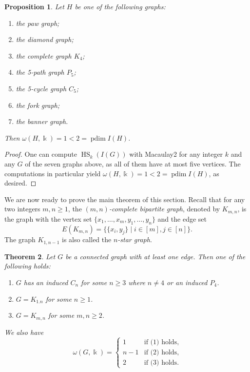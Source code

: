 \documentclass[reqno]{amsart}
\DeclareMathOperator{\pdim}{pdim}
\DeclareMathOperator{\HS}{HS}
\newtheorem{theorem}{Theorem}[section]
\newtheorem{proposition}[theorem]{Proposition}
\theoremstyle{definition}
\theoremstyle{remark}
\numberwithin{equation}{section}
\begin{document}
\begin{proposition}\label{prop:list-omega-1}
    Let $H$ be one of the following graphs: 
    \begin{enumerate}
        \item the paw graph;
        \item the diamond graph;
        \item the complete graph $K_4$;
        \item the 5-path graph $P_5$;
        \item the 5-cycle graph $C_5$;
        \item the fork graph;
        \item the banner graph.
    \end{enumerate} Then $\omega(H,\Bbbk)=1<2=\pdim I(H)$.
\end{proposition}

\begin{proof}
    One can compute $\HS_k(I(G))$ with Macaulay2 \cite{M2} for any integer $k$ and any $G$ of the seven graphs above, as all of them have at most five vertices. The computations in particular yield $\omega(H,\Bbbk)=1<2=\pdim I(H)$, as desired.
\end{proof}

We are now ready to prove the main theorem of this section. Recall that for any two integers $m,n\geq 1$, the \emph{$(m,n)$-complete bipartite graph}, denoted by $K_{m,n}$, is the graph with the vertex set $\{x_1,\dots, x_m, y_1, \dots, y_n\}$ and the edge set
\[
E(K_{m,n})=\{ \{x_i,y_j\} \mid  i
\in [m], j\in [n]\}.
\]
The graph $K_{1,n-1}$ is also called the \emph{$n$-star graph}.

\begin{theorem}\label{thm:omega-graphs}
    Let $G$ be a connected graph with at least one edge. Then one of the following holds:
    \begin{enumerate}
        \item $G$ has an induced $C_n$ for some $n\geq 3$ where $n\neq 4$ or an induced $P_4$.
        \item $G=K_{1.n}$ for some $n\geq 1$.
        \item $G=K_{m,n}$ for some $m,n\geq 2$.  
    \end{enumerate}
    We also have
    \[
    \omega(G,\Bbbk) = \begin{cases}
        1 & \text{if (1) holds},\\
        n-1 & \text{if (2) holds},\\
        2 & \text{if (3) holds}.
    \end{cases}
    \]
\end{theorem}
\end{document}
